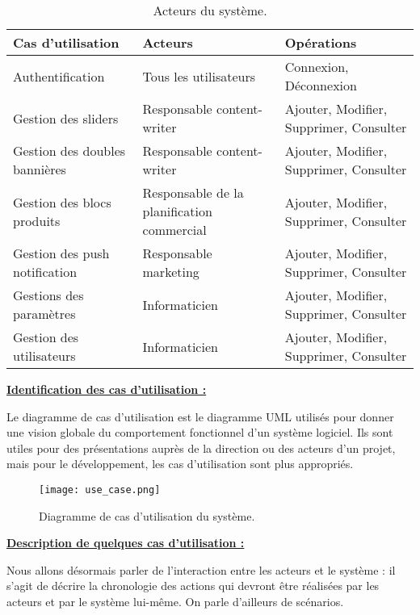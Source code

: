 \begin{table}[H]
	\caption{Acteurs du système.\cite{Ref8}}
	\label{Acteurs du système.}
	\centering
	\begin{tabularx}{\linewidth}{|X|X|X|}
		\hline \rowcolor{lightgray}  
		\textbf{Cas d'utilisation} & \textbf{Acteurs} & \textbf{Opérations}\\
		\hline
		Authentification & Tous les utilisateurs &  Connexion, Déconnexion\\
		\hline
		Gestion des sliders & Responsable content-writer &  Ajouter, Modifier, Supprimer, Consulter\\
		\hline
		Gestion des doubles bannières & Responsable content-writer  & Ajouter, Modifier, Supprimer, Consulter\\
		\hline
		Gestion des blocs produits  & Responsable de la planification commercial &  Ajouter, Modifier, Supprimer, Consulter \\	
		\hline
		Gestion des push notification & Responsable marketing  & Ajouter, Modifier, Supprimer, Consulter\\
		\hline
		Gestions des paramètres  & Informaticien & Ajouter, Modifier, Supprimer, Consulter\\
		\hline
		Gestion des utilisateurs & Informaticien & Ajouter, Modifier, Supprimer, Consulter \\
		\hline
	\end{tabularx}
\end{table}

\textbf{\underline{Identification des cas d’utilisation :}}

Le diagramme de cas d’utilisation est le diagramme UML utilisés pour donner une vision globale du comportement fonctionnel d’un système logiciel. Ils sont utiles pour des présentations auprès de la direction ou des acteurs d’un projet, mais pour le développement, les cas d’utilisation sont plus appropriés.

\begin{figure}[H]
	\centering
	\texttt{[image: use\_case.png]}
	\caption{Diagramme de cas d'utilisation du système.}
	\label{fig:use_cas}
\end{figure}

\textbf{\underline{Description de quelques cas d'utilisation :}}

Nous allons désormais parler de l’interaction entre les acteurs et le système : il s’agit de décrire la chronologie des actions qui devront être réalisées par les acteurs et par le système lui-même. On parle d’ailleurs de scénarios. 

